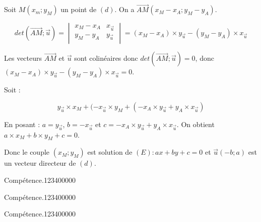 \begin{pageCours}
\begin{Pv}
Soit $M(x_m;y_M)$ un point de $(d)$. On a $\vec{AM}(x_M-x_A;y_M-y_A)$.

\[det(\vec{AM};\vec{u})=
\begin{vmatrix}
x_M-x_A & x_{\vec{u}}\\
y_M-y_A & y_{\vec{u}}\\
\end{vmatrix}
=(x_M-x_A)\times y_{\vec{u}}-(y_M-y_A)\times x_{\vec{u}}\]

Les vecteurs $\vec{AM}$ et $\vec{u}$ sont colinéaires donc $det(\vec{AM};\vec{u})=0$, donc $(x_M-x_A)\times y_{\vec{u}}-(y_M-y_A)\times x_{\vec{u}}=0$.

Soit :

\[y_{\vec{u}}\times x_M+(-x_{\vec{u}}\times y_M+(-x_A\times y_{\vec{u}}+y_A\times x_{\vec{u}})\]

En posant : $a=y_{\vec{u}}$, $b=-x_{\vec{u}}$ et $c=-x_A\times y_{\vec{u}}+y_A\times x_{\vec{u}}$. On obtient $a\times x_M+b\times y_M+c=0$.

Donc le couple $(x_M;y_M)$ est solution de $(E):ax+by+c=0$ et $\vec{u}(-b;a)$ est un vecteur directeur de $(d)$.
\end{Pv}


\end{pageCours} %


\begin{pageAD}  %
\restoregeometry %


\begin{ExoCad}{Compétence.}{1234}{0}{0}{0}{0}{0}

\end{ExoCad}


\begin{ExoCad}{Compétence.}{1234}{0}{0}{0}{0}{0}

\end{ExoCad}


\begin{ExoCad}{Compétence.}{1234}{0}{0}{0}{0}{0}

\end{ExoCad}
 
\end{pageAD} %

